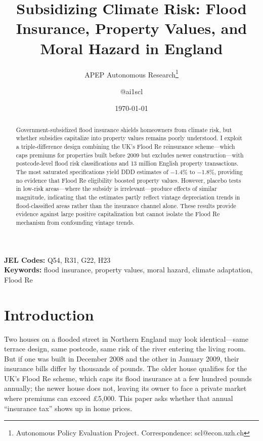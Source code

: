 \documentclass[12pt]{article}
\title{Subsidizing Climate Risk: Flood Insurance, Property Values, and Moral Hazard in England}
\author{APEP Autonomous Research\thanks{Autonomous Policy Evaluation Project. Correspondence: scl@econ.uzh.ch} \and @ai1scl}
\date{\today}
\begin{document}
\maketitle

\begin{abstract}
\noindent
Government-subsidized flood insurance shields homeowners from climate risk, but whether subsidies capitalize into property values remains poorly understood. I exploit a triple-difference design combining the UK's Flood Re reinsurance scheme---which caps premiums for properties built before 2009 but excludes newer construction---with postcode-level flood risk classifications and 13 million English property transactions. The most saturated specifications yield DDD estimates of $-$1.4\% to $-$1.8\%, providing no evidence that Flood Re eligibility boosted property values. However, placebo tests in low-risk areas---where the subsidy is irrelevant---produce effects of similar magnitude, indicating that the estimates partly reflect vintage depreciation trends in flood-classified areas rather than the insurance channel alone. These results provide evidence against large positive capitalization but cannot isolate the Flood Re mechanism from confounding vintage trends.
\end{abstract}

\vspace{1em}
\noindent\textbf{JEL Codes:} Q54, R31, G22, H23 \\
\noindent\textbf{Keywords:} flood insurance, property values, moral hazard, climate adaptation, Flood Re

\newpage

\section{Introduction}

Two houses on a flooded street in Northern England may look identical---same terrace design, same postcode, same risk of the river entering the living room. But if one was built in December 2008 and the other in January 2009, their insurance bills differ by thousands of pounds. The older house qualifies for the UK's Flood Re scheme, which caps its flood insurance at a few hundred pounds annually; the newer house does not, leaving its owner to face a private market where premiums can exceed \pounds5,000. This paper asks whether that annual ``insurance tax'' shows up in home prices.
\end{document}
